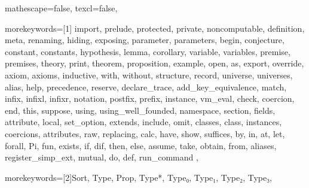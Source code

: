 
 {

mathescape=false,
texcl=false,

morekeywords=[1]{
import, prelude, protected, private, noncomputable, definition, meta, renaming,
hiding, exposing, parameter, parameters, begin, conjecture, constant, constants,
hypothesis, lemma, corollary, variable, variables, premise, premises, theory,
print, theorem, proposition, example,
open, as, export, override, axiom, axioms, inductive, with, without,
structure, record, universe, universes,
alias, help, precedence, reserve, declare_trace, add_key_equivalence,
match, infix, infixl, infixr, notation, postfix, prefix, instance,
vm_eval, check, coercion, end, this, suppose,
using, using_well_founded, namespace, section, fields,
attribute, local, set_option, extends, include, omit, classes, class,
instances, coercions, attributes, raw, replacing,
calc, have, show, suffices, by, in, at, let, forall, Pi, fun,
exists, if, dif, then, else, assume, take, obtain, from, aliases, register_simp_ext,
mutual, do, def, run_command
},

morekeywords=[2]{Sort, Type, Prop, Type*, Type₀, Type₁, Type₂, Type₃},



}
